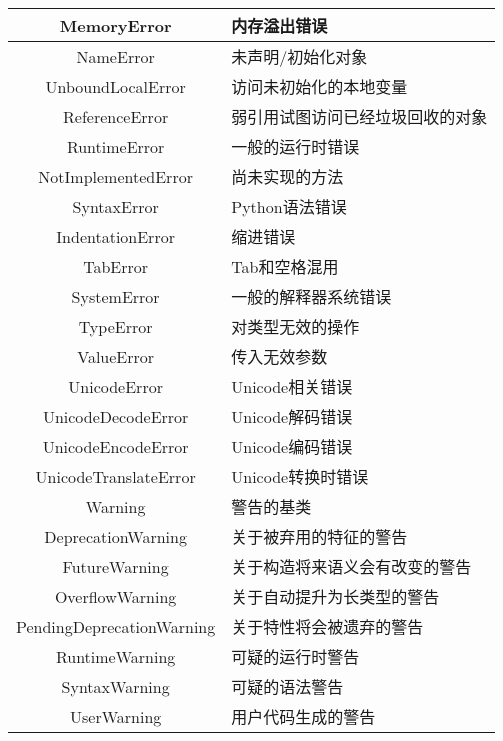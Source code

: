 \documentclass[11pt,a4paper]{article}
\begin{document}
\begin{CJK*}{UTF8}{nsung}
\begin{table}[!hbp]
\begin{tabular}{|c|l|}
\hline
MemoryError                       & 内存溢出错误\\
\hline
NameError                         & 未声明/初始化对象\\
\hline
UnboundLocalError                 & 访问未初始化的本地变量\\
\hline
ReferenceError                    & 弱引用试图访问已经垃圾回收的对象\\
\hline
RuntimeError                      & 一般的运行时错误\\
\hline
NotImplementedError               & 尚未实现的方法\\
\hline
SyntaxError                       & Python语法错误\\
\hline
IndentationError                  & 缩进错误\\
\hline
TabError                          & Tab和空格混用\\
\hline
SystemError                       & 一般的解释器系统错误\\
\hline
TypeError                         & 对类型无效的操作\\
\hline
ValueError                        & 传入无效参数\\
\hline
UnicodeError                      & Unicode相关错误\\
\hline
UnicodeDecodeError                & Unicode解码错误\\
\hline
UnicodeEncodeError                & Unicode编码错误\\
\hline
UnicodeTranslateError             & Unicode转换时错误\\
\hline
Warning                           & 警告的基类\\
\hline
DeprecationWarning                & 关于被弃用的特征的警告\\
\hline
FutureWarning                     & 关于构造将来语义会有改变的警告\\
\hline
OverflowWarning                   & 关于自动提升为长类型的警告\\
\hline
PendingDeprecationWarning         & 关于特性将会被遗弃的警告\\
\hline
RuntimeWarning                    & 可疑的运行时警告\\
\hline
SyntaxWarning                     & 可疑的语法警告\\
\hline
UserWarning                       & 用户代码生成的警告\\
\hline
\end{tabular}

\end{table}


\end{CJK*}
\end{document}
